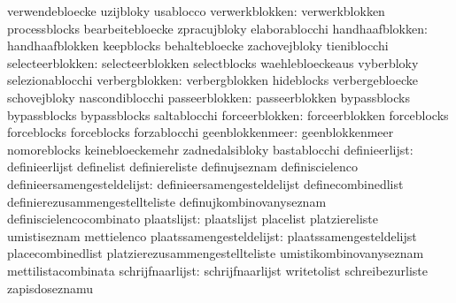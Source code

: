                                   verwendebloecke                  uzijbloky
                                  usablocco
                 verwerkblokken:  verwerkblokken                   processblocks
                                  bearbeitebloecke                 zpracujbloky
                                  elaborablocchi
                handhaafblokken:  handhaafblokken                  keepblocks
                                  behaltebloecke                   zachovejbloky
                                  tieniblocchi
               selecteerblokken:  selecteerblokken                 selectblocks
                                  waehlebloeckeaus                 vyberbloky
                                  selezionablocchi
                 verbergblokken:  verbergblokken                   hideblocks
                                  verbergebloecke                  schovejbloky
                                  nascondiblocchi
                 passeerblokken:  passeerblokken                   bypassblocks
                                  bypassblocks                     bypassblocks
                                  saltablocchi
                 forceerblokken:  forceerblokken                   forceblocks
                                  forceblocks                      forceblocks
                                  forzablocchi
                geenblokkenmeer:  geenblokkenmeer                  nomoreblocks
                                  keinebloeckemehr                 zadnedalsibloky
                                  bastablocchi
                 definieerlijst:  definieerlijst                   definelist
                                  definiereliste                   definujseznam
                                  definiscielenco
    definieersamengesteldelijst:  definieersamengesteldelijst      definecombinedlist
                                  definierezusammengestellteliste  definujkombinovanyseznam
                                  definiscielencocombinato
                    plaatslijst:  plaatslijst                      placelist
                                  platziereliste                   umistiseznam
                                  mettielenco
       plaatssamengesteldelijst:  plaatssamengesteldelijst         placecombinedlist
                                  platzierezusammengestellteliste  umistikombinovanyseznam
                                  mettilistacombinata
               schrijfnaarlijst:  schrijfnaarlijst                 writetolist
                                  schreibezurliste                 zapisdoseznamu
